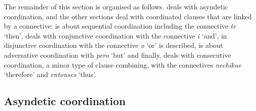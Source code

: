 \largerpage[-2]
The remainder of this section is organised as follows.  deals with asyndetic coordination, and the other sections deal with coordinated clauses that are linked by a connective:  is about sequential coordination including the connective \textit{te} ‘then’,  deals with conjunctive coordination with the connective \textit{i} ‘and’, in  disjunctive coordination with the connective \textit{o} ‘or’ is described,  is about adversative coordination with \textit{pero} ‘but’ and finally,  deals with consecutive coordination, a minor type of clause combining, with the connectives \textit{nechikue} ‘therefore’ and \textit{entonses} ‘thus’.

\subsection{Asyndetic coordination}\label{sec:AsyndeticCoordination}








